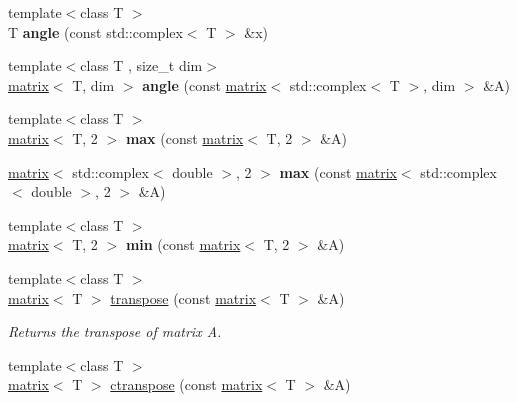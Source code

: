 \begin{DoxyCompactItemize}
\item 
\hypertarget{namespacekeycpp_aaa2e17334911e8a447a5ef6c0cc54c3f}{{\footnotesize template$<$class T $>$ }\\T {\bfseries angle} (const std\-::complex$<$ T $>$ \&x)}\label{namespacekeycpp_aaa2e17334911e8a447a5ef6c0cc54c3f}

\item 
\hypertarget{namespacekeycpp_afbbe373666d686c14e6ce6517d050373}{{\footnotesize template$<$class T , size\-\_\-t dim$>$ }\\\hyperlink{classkeycpp_1_1matrix}{matrix}$<$ T, dim $>$ {\bfseries angle} (const \hyperlink{classkeycpp_1_1matrix}{matrix}$<$ std\-::complex$<$ T $>$, dim $>$ \&A)}\label{namespacekeycpp_afbbe373666d686c14e6ce6517d050373}

\item 
\hypertarget{namespacekeycpp_adc1d5c652ba4edec0c41b01e36f6a977}{{\footnotesize template$<$class T $>$ }\\\hyperlink{classkeycpp_1_1matrix}{matrix}$<$ T, 2 $>$ {\bfseries max} (const \hyperlink{classkeycpp_1_1matrix}{matrix}$<$ T, 2 $>$ \&A)}\label{namespacekeycpp_adc1d5c652ba4edec0c41b01e36f6a977}

\item 
\hypertarget{namespacekeycpp_adafc954673ba1f1fb140d83ba1d88a23}{\hyperlink{classkeycpp_1_1matrix}{matrix}$<$ std\-::complex$<$ double $>$, 2 $>$ {\bfseries max} (const \hyperlink{classkeycpp_1_1matrix}{matrix}$<$ std\-::complex$<$ double $>$, 2 $>$ \&A)}\label{namespacekeycpp_adafc954673ba1f1fb140d83ba1d88a23}

\item 
\hypertarget{namespacekeycpp_a96f9dd276a27f616258da602ee559541}{{\footnotesize template$<$class T $>$ }\\\hyperlink{classkeycpp_1_1matrix}{matrix}$<$ T, 2 $>$ {\bfseries min} (const \hyperlink{classkeycpp_1_1matrix}{matrix}$<$ T, 2 $>$ \&A)}\label{namespacekeycpp_a96f9dd276a27f616258da602ee559541}

\item 
\hypertarget{namespacekeycpp_a7fd5ce0385e9cc7bed5b44ed8475e8aa}{{\footnotesize template$<$class T $>$ }\\\hyperlink{classkeycpp_1_1matrix}{matrix}$<$ T $>$ \hyperlink{namespacekeycpp_a7fd5ce0385e9cc7bed5b44ed8475e8aa}{transpose} (const \hyperlink{classkeycpp_1_1matrix}{matrix}$<$ T $>$ \&A)}\label{namespacekeycpp_a7fd5ce0385e9cc7bed5b44ed8475e8aa}

\begin{DoxyCompactList}\small\item\em Returns the transpose of matrix A. \end{DoxyCompactList}\item 
\hypertarget{namespacekeycpp_a14503c0419f365433d88fa081d473210}{{\footnotesize template$<$class T $>$ }\\\hyperlink{classkeycpp_1_1matrix}{matrix}$<$ T $>$ \hyperlink{namespacekeycpp_a14503c0419f365433d88fa081d473210}{ctranspose} (const \hyperlink{classkeycpp_1_1matrix}{matrix}$<$ T $>$ \&A)}\label{namespacekeycpp_a14503c0419f365433d88fa081d473210}


\end{DoxyCompactItemize}
